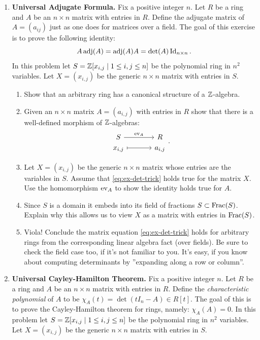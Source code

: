 \documentclass[12pt,reqno]{amsart}
\begin{document}
\begin{enumerate}[leftmargin=*, resume=problems]
\item \textbf{Universal Adjugate Formula.} Fix a positive integer $n$. Let $R$ be a ring and $A$ be an $n \times n$ matrix with entries in $R$. Define the adjugate matrix of $A=(a_{ij})$ just as one does for matrices over a field. The goal of this exercise is to prove the following identity:
\begin{equation}\label{eq:ex-det-trick}
A\operatorname{adj}(A) = \operatorname{adj}(A)A=\det(A)\operatorname{Id}_{n\times n}.
\end{equation}
In this problem let $S=\mathbb{Z}[x_{i,j}\mid 1\leq i,j\leq n]$ be the polynomial ring in $n^2$ variables. Let $X=(x_{i,j})$ be the generic $n\times n$ matrix with entries in $S$.
\begin{enumerate} 
\item Show that an arbitrary ring has a canonical structure of a $\mathbb{Z}$-algebra.
\item Given an $n \times n$ matrix $A=(a_{i,j})$ with entries in $R$ show that there is a well-defined morphism of $\mathbb{Z}$-algebras:
\[
\begin{tikzcd}[row sep = .3em, column sep = 3.5em]
S \arrow[r, "\ev_{A}"] & R \\
x_{i,j} \arrow[r, mapsto] & a_{i,j}
\end{tikzcd}.
\]
\item Let $X=(x_{i,j})$ be the generic $n\times n$ matrix whose entries are the variables in $S$. Assume that \eqref{eq:ex-det-trick} holds true for the matrix $X$. Use the homomorphism $\operatorname{ev}_{A}$ to show the identity holds true for $A$. 
\item Since $S$ is a domain it embeds into its field of fractions $S \subset \operatorname{Frac}(S)$. Explain why this allows us to view $X$ as a matrix with entries in $\operatorname{Frac}(S)$. 
\item Viola! Conclude the matrix equation \eqref{eq:ex-det-trick} holds for arbitrary rings from the corresponding linear algebra fact (over fields). Be sure to check the field case too, if it’s not familiar to you. It’s easy, if you know about computing determinants by ”expanding along a row or column''.
\end{enumerate}

\item \textbf{Universal Cayley-Hamilton Theorem.} Fix a positive integer $n$. Let $R$ be a ring and $A$ be an $n \times n$ matrix with entries in $R$. Define the \emph{characteristic polynomial} of $A$ to be $\chi_{A}(t)=\det(tI_n-A)\in R[t]$. The goal of this is to prove the Cayley-Hamilton theorem for rings, namely: $\chi_{A}(A)=0$. In this problem let $S=\mathbb{Z}[x_{i,j}\mid 1\leq i,j\leq n]$ be the polynomial ring in $n^2$ variables. Let $X=(x_{i,j})$ be the generic $n\times n$ matrix with entries in $S$.


\end{enumerate}
\end{document}
